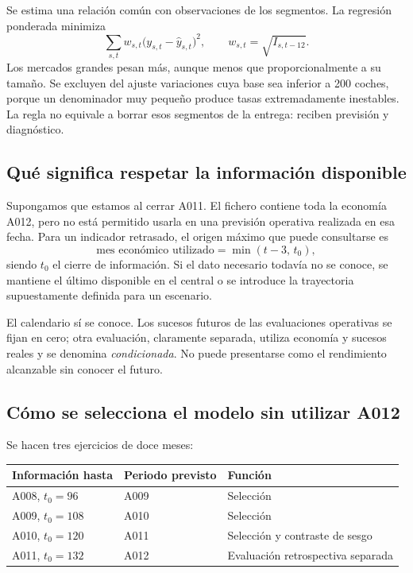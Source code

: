 Se estima una relación común con observaciones de los segmentos. La regresión
ponderada minimiza
\begin{equation}
 \sum_{s,t} w_{s,t}\bigl(y_{s,t}-\widehat y_{s,t}\bigr)^2,
 \qquad w_{s,t}=\sqrt{I_{s,t-12}}.
\end{equation}
Los mercados grandes pesan más, aunque menos que proporcionalmente a su tamaño.
Se excluyen del ajuste variaciones cuya base sea inferior a 200 coches, porque
un denominador muy pequeño produce tasas extremadamente inestables. La regla
no equivale a borrar esos segmentos de la entrega: reciben previsión y diagnóstico.

\subsection{Qué significa respetar la información disponible}
Supongamos que estamos al cerrar A011. El fichero contiene toda la economía
A012, pero no está permitido usarla en una previsión operativa realizada en
esa fecha. Para un indicador retrasado, el origen máximo que puede consultarse es
\begin{equation}
 \text{mes económico utilizado}=\min(t-3,\,t_0),
\end{equation}
siendo $t_0$ el cierre de información. Si el dato necesario todavía no se conoce,
se mantiene el último disponible en el central o se introduce la trayectoria
supuestamente definida para un escenario.

El calendario sí se conoce. Los sucesos futuros de las evaluaciones operativas
se fijan en cero; otra evaluación, claramente separada, utiliza economía y
sucesos reales y se denomina \emph{condicionada}. No puede presentarse como el
rendimiento alcanzable sin conocer el futuro.

\subsection{Cómo se selecciona el modelo sin utilizar A012}
Se hacen tres ejercicios de doce meses:
\begin{center}
\begin{tabular}{@{}lll@{}}\toprule
Información hasta & Periodo previsto & Función \\\midrule
A008, $t_0=96$ & A009 & Selección \\
A009, $t_0=108$ & A010 & Selección \\
A010, $t_0=120$ & A011 & Selección y contraste de sesgo \\
A011, $t_0=132$ & A012 & Evaluación retrospectiva separada \\\bottomrule
\end{tabular}
\end{center}

